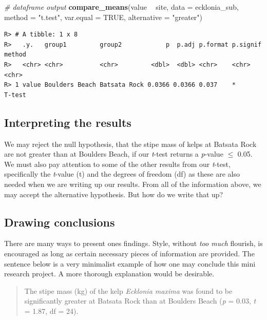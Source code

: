 \documentclass[english,10pt,a4paper,oneside]{book}
\newenvironment{Shaded}{\begin{snugshade}}{\end{snugshade}}
\newcommand{\KeywordTok}[1]{\textcolor[rgb]{0.13,0.29,0.53}{\textbf{#1}}}
\newcommand{\DataTypeTok}[1]{\textcolor[rgb]{0.13,0.29,0.53}{#1}}
\newcommand{\StringTok}[1]{\textcolor[rgb]{0.31,0.60,0.02}{#1}}
\newcommand{\CommentTok}[1]{\textcolor[rgb]{0.56,0.35,0.01}{\textit{#1}}}
\newcommand{\OtherTok}[1]{\textcolor[rgb]{0.56,0.35,0.01}{#1}}
\newcommand{\OperatorTok}[1]{\textcolor[rgb]{0.81,0.36,0.00}{\textbf{#1}}}
\newcommand{\NormalTok}[1]{#1}
\theoremstyle{definition}
\theoremstyle{definition}
\theoremstyle{definition}
\theoremstyle{remark}
\begin{document}
\begin{Shaded}
\begin{Highlighting}[]
\CommentTok{# dataframe output}
\KeywordTok{compare_means}\NormalTok{(value }\OperatorTok{~}\StringTok{ }\NormalTok{site, }\DataTypeTok{data =}\NormalTok{ ecklonia_sub, }\DataTypeTok{method =} \StringTok{"t.test"}\NormalTok{, }\DataTypeTok{var.equal =} \OtherTok{TRUE}\NormalTok{, }\DataTypeTok{alternative =} \StringTok{"greater"}\NormalTok{)}
\end{Highlighting}
\end{Shaded}

\begin{verbatim}
R> # A tibble: 1 x 8
R>   .y.   group1         group2            p  p.adj p.format p.signif method
R>   <chr> <chr>          <chr>         <dbl>  <dbl> <chr>    <chr>    <chr> 
R> 1 value Boulders Beach Batsata Rock 0.0366 0.0366 0.037    *        T-test
\end{verbatim}

\subsection{Interpreting the results}\label{interpreting-the-results}

We may reject the null hypothesis, that the stipe mass of kelps at
Batsata Rock are not greater than at Boulders Beach, if our
\emph{t}-test returns a \emph{p}-value \(\leq\) 0.05. We must also pay
attention to some of the other results from our \emph{t}-test,
specifically the \emph{t}-value (t) and the degrees of freedom (df) as
these are also needed when we are writing up our results. From all of
the information above, we may accept the alternative hypothesis. But how
do we write that up?

\subsection{Drawing conclusions}\label{drawing-conclusions}

There are many ways to present ones findings. Style, without \emph{too
much} flourish, is encouraged as long as certain necessary pieces of
information are provided. The sentence below is a very minimalist
example of how one may conclude this mini research project. A more
thorough explanation would be desirable.

\begin{quote}
The stipe mass (kg) of the kelp \emph{Ecklonia maxima} was found to be
significantly greater at Batsata Rock than at Boulders Beach (\emph{p} =
0.03, \emph{t} = 1.87, df = 24).
\end{quote}
\end{document}
